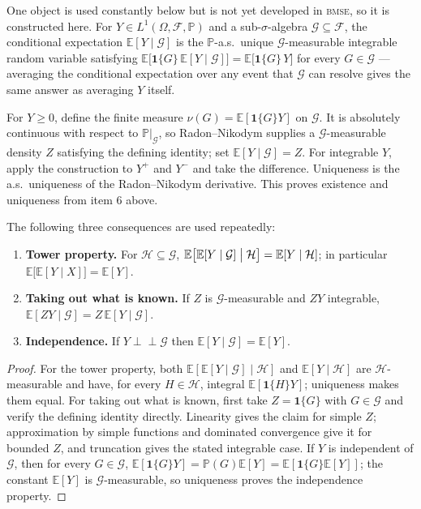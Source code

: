 \documentclass[11pt,a4paper]{article}
\theoremstyle{plain}
\theoremstyle{definition}
\theoremstyle{remark}
\newcommand{\E}{\mathbb E}
\newcommand{\Prob}{\mathbb P}
\newcommand{\indep}{\perp\!\!\!\perp}
\newcommand{\one}[1]{\mathbf 1\{#1\}}
\newcommand{\probrepo}{\textsc{bmse}}
\begin{document}
One object is used constantly below but is not yet developed in \probrepo{}, so it is
constructed here. For $Y\in L^1(\Omega,\mathcal F,\Prob)$ and a sub-$\sigma$-algebra
$\mathcal G\subseteq\mathcal F$, the conditional expectation $\E[Y\mid\mathcal G]$ is the
$\Prob$-a.s.\ unique $\mathcal G$-measurable integrable random variable satisfying
$\E\bigl[\one{G}\,\E[Y\mid\mathcal G]\bigr]=\E\bigl[\one{G}\,Y\bigr]$ for every $G\in\mathcal G$
--- averaging the conditional expectation over any event that $\mathcal G$ can resolve gives the
same answer as averaging $Y$ itself.

For $Y\ge0$, define the finite measure $\nu(G)=\E[\one GY]$ on $\mathcal G$. It is absolutely
continuous with respect to $\Prob|_{\mathcal G}$, so Radon--Nikodym supplies a
$\mathcal G$-measurable density $Z$ satisfying the defining identity; set
$\E[Y\mid\mathcal G]=Z$. For integrable $Y$, apply the construction to $Y^+$ and $Y^-$ and take
the difference. Uniqueness is the a.s.\ uniqueness of the Radon--Nikodym derivative. This proves
existence and uniqueness from item 6 above.

The following three consequences are used repeatedly:

\begin{enumerate}[leftmargin=*]
\item \textbf{Tower property.} For $\mathcal H\subseteq\mathcal G$,
$\E\bigl[\E[Y\mid\mathcal G]\bigm|\mathcal H\bigr]=\E[Y\mid\mathcal H]$; in particular
$\E\bigl[\E[Y\mid X]\bigr]=\E[Y]$.
\item \textbf{Taking out what is known.} If $Z$ is $\mathcal G$-measurable and $ZY$ integrable,
$\E[ZY\mid\mathcal G]=Z\,\E[Y\mid\mathcal G]$.
\item \textbf{Independence.} If $Y\indep\mathcal G$ then $\E[Y\mid\mathcal G]=\E[Y]$.
\end{enumerate}

\begin{proof}
For the tower property, both $\E[\E[Y\mid\mathcal G]\mid\mathcal H]$ and
$\E[Y\mid\mathcal H]$ are $\mathcal H$-measurable and have, for every $H\in\mathcal H$, integral
$\E[\one HY]$; uniqueness makes them equal. For taking out what is known, first take
$Z=\one G$ with $G\in\mathcal G$ and verify the defining identity directly. Linearity gives the
claim for simple $Z$; approximation by simple functions and dominated convergence give it for
bounded $Z$, and truncation gives the stated integrable case. If $Y$ is independent of
$\mathcal G$, then for every $G\in\mathcal G$,
$\E[\one GY]=\Prob(G)\E[Y]=\E[\one G\E[Y]]$; the constant $\E[Y]$ is
$\mathcal G$-measurable, so uniqueness proves the independence property.
\end{proof}
\end{document}
